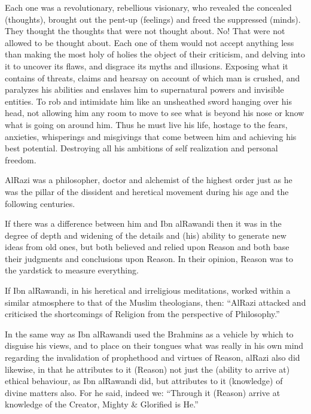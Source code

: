 \documentclass[12pt]{memoir}
\begin{document}
Each one was a revolutionary, rebellious visionary,
who revealed the concealed (thoughts),
brought out the pent-up (feelings) and freed the suppressed (minds).
They thought the thoughts that were not thought about.
No! That were not allowed to be thought about.
Each one of them would not accept anything less than making the most holy
of holies the object of their criticism,
and delving into it to uncover its flaws,
and disgrace its myths and illusions.
Exposing what it contains of threats, claims and hearsay on account
of which man is crushed, and paralyzes his abilities and enslaves him to
supernatural powers and invisible entities.
To rob and intimidate him like an unsheathed sword hanging over his head,
not allowing him any room to move to see what is beyond his nose or know
what is going on around him.
Thus he must live his life, hostage to the fears, anxieties,
whisperings and misgivings that come between him and
achieving his best potential.
Destroying all his ambitions of self realization and personal freedom.

Al\–Razi was a philosopher, doctor and alchemist of the highest order just as
he was the pillar of the dissident and heretical movement during his age and
the following centuries.

If there was a difference between him and Ibn al\–Rawandi then it was in the
degree of depth and widening of the details and (his) ability to generate
new ideas from old ones, but both believed and relied upon Reason and
both base their judgments and conclusions upon Reason.
In their opinion, Reason was to the yardstick to measure everything.

If Ibn al\–Rawandi, in his heretical and irreligious meditations,
worked within a similar atmosphere to that of the Muslim theologians, then:
“Al\–Razi attacked and criticised the shortcomings of Religion from the
perspective of Philosophy.”\fnmark


In the same way as Ibn al\–Rawandi used the Brahmins as a vehicle by which
to disguise his views, and to place on their tongues what was really in his
own mind regarding the invalidation of prophethood and virtues of Reason,
al\–Razi also did likewise, in that he attributes to it (Reason) not just the
(ability to arrive at) ethical behaviour, as Ibn al\–Rawandi did,
but attributes to it (knowledge) of divine matters also.
For he said, indeed we:
“Through it (Reason) arrive at knowledge of the Creator,
Mighty \& Glorified is He.”\fnmark
\end{document}
